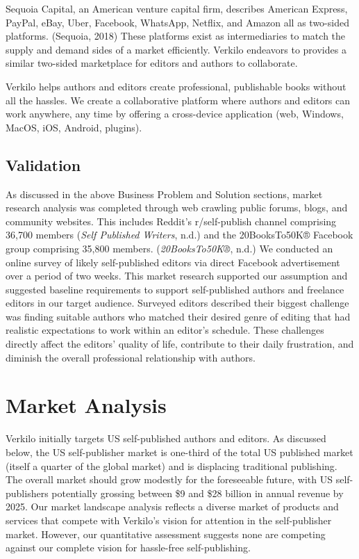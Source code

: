 \documentclass[10pt,openany]{book}
\begin{document}
Sequoia Capital, an American venture capital firm, describes American
Express, PayPal, eBay, Uber, Facebook, WhatsApp, Netflix, and Amazon all
as two-sided platforms. (Sequoia, 2018) These platforms exist as
intermediaries to match the supply and demand sides of a market
efficiently. Verkilo endeavors to provides a similar two-sided
marketplace for editors and authors to collaborate.

Verkilo helps authors and editors create professional, publishable books
without all the hassles. We create a collaborative platform where
authors and editors can work anywhere, any time by offering a
cross-device application (web, Windows, MacOS, iOS, Android, plugins).

\newpage

\hypertarget{validation}{%
\section{Validation}\label{validation}}

As discussed in the above Business Problem and Solution sections, market
research analysis was completed through web crawling public forums,
blogs, and community websites. This includes Reddit's r/self-publish
channel comprising 36,700 members (\emph{Self Published Writers}, n.d.)
and the 20BooksTo50K® Facebook group comprising 35,800 members.
(\emph{20BooksTo50K®}, n.d.) We conducted an online survey of likely
self-published editors via direct Facebook advertisement over a period
of two weeks. This market research supported our assumption and
suggested baseline requirements to support self-published authors and
freelance editors in our target audience. Surveyed editors described
their biggest challenge was finding suitable authors who matched their
desired genre of editing that had realistic expectations to work within
an editor's schedule. These challenges directly affect the editors'
quality of life, contribute to their daily frustration, and diminish the
overall professional relationship with authors.

\hypertarget{market-analysis}{%
\chapter{Market Analysis}\label{market-analysis}}

Verkilo initially targets US self-published authors and editors. As
discussed below, the US self-publisher market is one-third of the total
US published market (itself a quarter of the global market) and is
displacing traditional publishing. The overall market should grow
modestly for the foreseeable future, with US self-publishers potentially
grossing between \$9 and \$28 billion in annual revenue by 2025. Our
market landscape analysis reflects a diverse market of products and
services that compete with Verkilo's vision for attention in the
self-publisher market. However, our quantitative assessment suggests
none are competing against our complete vision for hassle-free
self-publishing.
\end{document}
